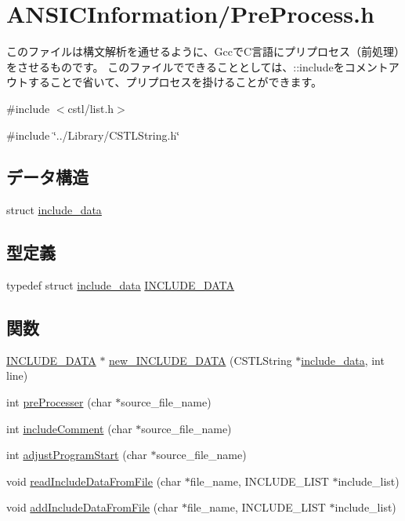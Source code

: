 \section{ANSICInformation/PreProcess.h}
\label{PreProcess_8h}


このファイルは構文解析を通せるように、GccでC言語にプリプロセス（前処理）をさせるものです。 このファイルでできることとしては、::includeをコメントアウトすることで省いて、プリプロセスを掛けることができます。  


{\ttfamily \#include $<$cstl/list.h$>$}\par
{\ttfamily \#include \char`\"{}../Library/CSTLString.h\char`\"{}}\par
\subsection*{データ構造}
\begin{DoxyCompactItemize}
\item 
struct \hyperlink{structinclude__data}{include\_\-data}
\end{DoxyCompactItemize}
\subsection*{型定義}
\begin{DoxyCompactItemize}
\item 
typedef struct \hyperlink{structinclude__data}{include\_\-data} \hyperlink{PreProcess_8h_a6d1a2dd96f6fa562d010b81ac0b69b21}{INCLUDE\_\-DATA}
\end{DoxyCompactItemize}
\subsection*{関数}
\begin{DoxyCompactItemize}
\item 
\hyperlink{structinclude__data}{INCLUDE\_\-DATA} $\ast$ \hyperlink{PreProcess_8h_a374f2859fbe8b968002a64b7ddedb676}{new\_\-INCLUDE\_\-DATA} (CSTLString $\ast$\hyperlink{structinclude__data}{include\_\-data}, int line)
\item 
int \hyperlink{PreProcess_8h_a3af15f622d39d61db338a5b2e0c659b8}{preProcesser} (char $\ast$source\_\-file\_\-name)
\item 
int \hyperlink{PreProcess_8h_a8f4e9a441c1ba8c61a31f1d9fa70f7a2}{includeComment} (char $\ast$source\_\-file\_\-name)
\item 
int \hyperlink{PreProcess_8h_a09e6288734c2015b2a7ec902afe34857}{adjustProgramStart} (char $\ast$source\_\-file\_\-name)
\item 
void \hyperlink{PreProcess_8h_a00b38a511fb2d9388ca76b7782890673}{readIncludeDataFromFile} (char $\ast$file\_\-name, INCLUDE\_\-LIST $\ast$include\_\-list)
\item 
void \hyperlink{PreProcess_8h_ad7bd5ce64ec94dac854c4633c099b379}{addIncludeDataFromFile} (char $\ast$file\_\-name, INCLUDE\_\-LIST $\ast$include\_\-list)
\end{DoxyCompactItemize}


